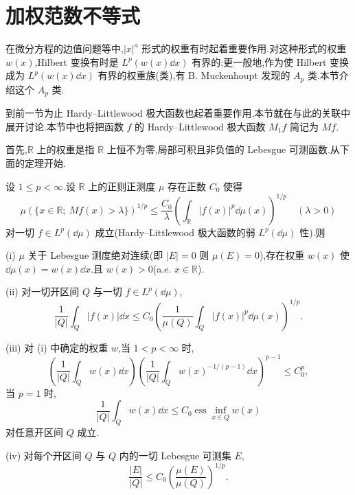 \section{加权范数不等式}\label{sec:1.11}


在微分方程的边值问题等中,$|x|^{a}$ 形式的权重有时起着重要作用.对这种形式的权重 $w(x)$,Hilbert 变换有时是 $L^{p}(w(x)\dd x)$ 有界的;更一般地,作为使 Hilbert 变换成为 $L^{p}(w(x)\dd x)$ 有界的权重族(类),有 B. Muckenhoupt 发现的 $A_{p}$ 类.本节介绍这个 $A_{p}$ 类.

到前一节为止 Hardy--Littlewood 极大函数也起着重要作用,本节就在与此的关联中展开讨论.本节中也将把函数 $f$ 的 Hardy--Littlewood 极大函数 $M_{1}f$ 简记为 $Mf$.

首先,$\mathbb{R}$ 上的权重是指 $\mathbb{R}$ 上恒不为零,局部可积且非负值的 Lebesgue 可测函数.从下面的定理开始.

\begin{theorem}\label{thm:1.11.1}
设 $1 \leq p < \infty$.设 $\mathbb{R}$ 上的正则正测度 $\mu$ 存在正数 $C_{0}$ 使得
\begin{equation}\tag{1.11.1}
\mu(\{x \in \mathbb{R};\ Mf(x) > \lambda\})^{1/p} \leq \frac{C_{0}}{\lambda}\left(\int_{\mathbb{R}}|f(x)|^{p}\dd\mu(x)\right)^{1/p} \quad (\lambda > 0)
\label{eq:1.11.1}\end{equation}
对一切 $f \in L^{p}(\dd\mu)$ 成立(Hardy--Littlewood 极大函数的弱 $L^{p}(\dd\mu)$ 性).则

(i) $\mu$ 关于 Lebesgue 测度绝对连续(即 $|E| = 0$ 则 $\mu(E) = 0$),存在权重 $w(x)$ 使 $\dd\mu(x) = w(x)\dd x$.且 $w(x) > 0$(a.e. $x \in \mathbb{R}$).

(ii) 对一切开区间 $Q$ 与一切 $f \in L^{p}(\dd\mu)$,
\begin{equation}\tag{1.11.2}
\frac{1}{|Q|}\int_{Q}|f(x)|\dd x \leq C_{0}\left(\frac{1}{\mu(Q)}\int_{Q}|f(x)|^{p}\dd\mu(x)\right)^{1/p}.
\label{eq:1.11.2}\end{equation}

(iii) 对 (i) 中确定的权重 $w$,当 $1 < p < \infty$ 时,
\begin{equation}\tag{1.11.3}
\left(\frac{1}{|Q|}\int_{Q}w(x)\dd x\right)\left(\frac{1}{|Q|}\int_{Q}w(x)^{-1/(p-1)}\dd x\right)^{p-1} \leq C_{0}^{p},
\label{eq:1.11.3}\end{equation}
当 $p = 1$ 时,
\begin{equation}\tag{1.11.4}
\frac{1}{|Q|}\int_{Q}w(x)\dd x \leq C_{0}\operatorname{ess}\inf_{x \in Q}w(x)
\label{eq:1.11.4}\end{equation}
对任意开区间 $Q$ 成立.

(iv) 对每个开区间 $Q$ 与 $Q$ 内的一切 Lebesgue 可测集 $E$,
\begin{equation}\tag{1.11.5}
\frac{|E|}{|Q|} \leq C_{0}\left(\frac{\mu(E)}{\mu(Q)}\right)^{1/p}.
\label{eq:1.11.5}\end{equation}
\end{theorem}

